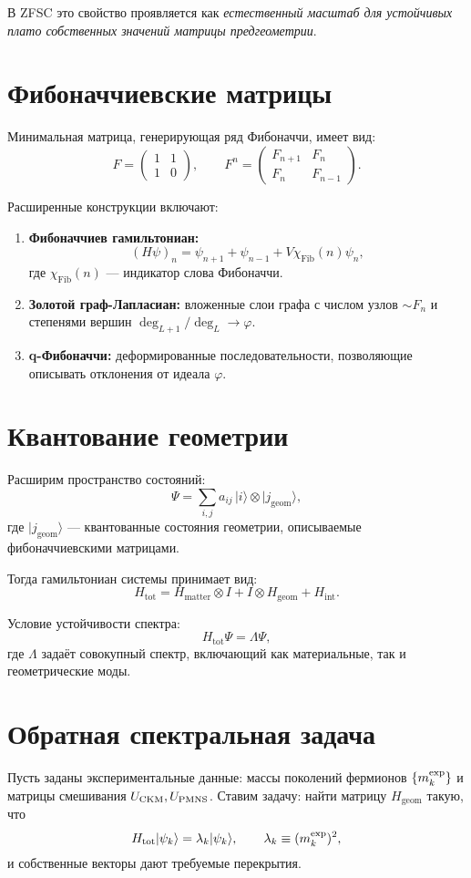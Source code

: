 \documentclass[12pt,a4paper]{article}
\begin{document}
В ZFSC это свойство проявляется как \emph{естественный масштаб для устойчивых плато собственных значений матрицы предгеометрии}.

\section{Фибоначчиевские матрицы}
Минимальная матрица, генерирующая ряд Фибоначчи, имеет вид:
\[
F = \begin{pmatrix} 1 & 1 \\ 1 & 0 \end{pmatrix}, \qquad
F^n = \begin{pmatrix} F_{n+1} & F_n \\ F_n & F_{n-1} \end{pmatrix}.
\]

Расширенные конструкции включают:
\begin{enumerate}
    \item \textbf{Фибоначчиев гамильтониан:}
    \[
    (H\psi)_n = \psi_{n+1} + \psi_{n-1} + V \chi_{\text{Fib}}(n)\psi_n ,
    \]
    где $\chi_{\text{Fib}}(n)$ — индикатор слова Фибоначчи.
    \item \textbf{Золотой граф-Лапласиан:} вложенные слои графа с числом узлов $\sim F_n$ и степенями вершин $\deg_{L+1}/\deg_L \to \varphi$.
    \item \textbf{q-Фибоначчи:} деформированные последовательности, позволяющие описывать отклонения от идеала $\varphi$.
\end{enumerate}

\section{Квантование геометрии}
Расширим пространство состояний:
\[
\Psi = \sum_{i,j} a_{ij}\, |i\rangle \otimes |j_{\text{geom}}\rangle ,
\]
где $|j_{\text{geom}}\rangle$ — квантованные состояния геометрии, описываемые фибоначчиевскими матрицами.

Тогда гамильтониан системы принимает вид:
\[
H_{\text{tot}} = H_{\text{matter}} \otimes I + I \otimes H_{\text{geom}} + H_{\text{int}}.
\]

Условие устойчивости спектра:
\[
H_{\text{tot}} \Psi = \Lambda \Psi ,
\]
где $\Lambda$ задаёт совокупный спектр, включающий как материальные, так и геометрические моды.

\section{Обратная спектральная задача}
Пусть заданы экспериментальные данные: массы поколений фермионов $\{m_k^{\rm exp}\}$ и матрицы смешивания $U_{\rm CKM}, U_{\rm PMNS}$.  
Ставим задачу: найти матрицу $H_{\text{geom}}$ такую, что
\[
H_{\text{tot}} | \psi_k \rangle = \lambda_k | \psi_k \rangle, \qquad \lambda_k \equiv (m_k^{\rm exp})^2,
\]
и собственные векторы дают требуемые перекрытия.
\end{document}
